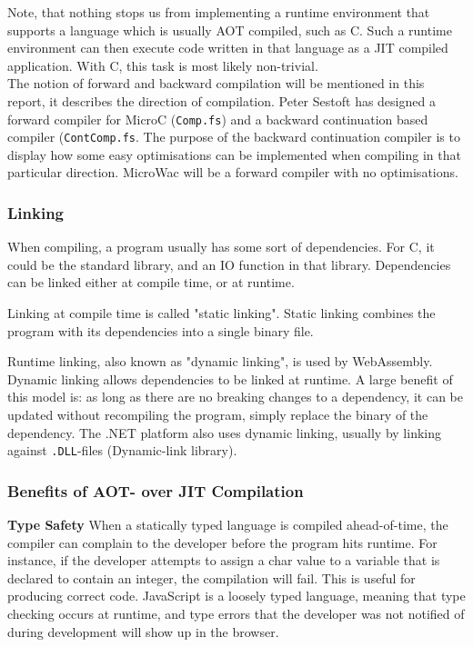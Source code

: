\documentclass[a4paper]{article}
\begin{document}
Note, that nothing stops us from implementing a runtime environment that supports a language which is usually AOT compiled, such as C. Such a runtime environment can then execute code written in that language as a JIT compiled application. With C, this task is most likely non-trivial.\\

The notion of forward and backward compilation will be mentioned in this report, it describes the direction of compilation. Peter Sestoft has designed a forward compiler for MicroC (\texttt{Comp.fs}) and a backward continuation based compiler (\texttt{ContComp.fs}. The purpose of the backward continuation compiler is to display how some easy optimisations can be implemented when compiling in that particular direction. MicroWac will be a forward compiler with no optimisations.

\subsubsection{Linking}
\label{sec:problem-analysis:compilers:linking}
When compiling, a program usually has some sort of dependencies. For C, it could be the standard library, and an IO function in that library. Dependencies can be linked either at compile time, or at runtime.

Linking at compile time is called "static linking". Static linking combines the program with its dependencies into a single binary file.

Runtime linking, also known as "dynamic linking", is used by WebAssembly. Dynamic linking allows dependencies to be linked at runtime. A large benefit of this model is: as long as there are no breaking changes to a dependency, it can be updated without recompiling the program, simply replace the binary of the dependency. The .NET platform also uses dynamic linking, usually by linking against \texttt{.DLL}-files (Dynamic-link library).

\subsubsection{Benefits of AOT- over JIT Compilation}
\label{sec:problem-analysis:compilers:benefits-of-aot}
\textbf{Type Safety} When a statically typed language is compiled ahead-of-time, the compiler can complain to the developer before the program hits runtime. For instance, if the developer attempts to assign a char value to a variable that is declared to contain an integer, the compilation will fail. This is useful for producing correct code. JavaScript is a loosely typed language, meaning that type checking occurs at runtime, and type errors that the developer was not notified of during development will show up in the browser.\\
\end{document}
